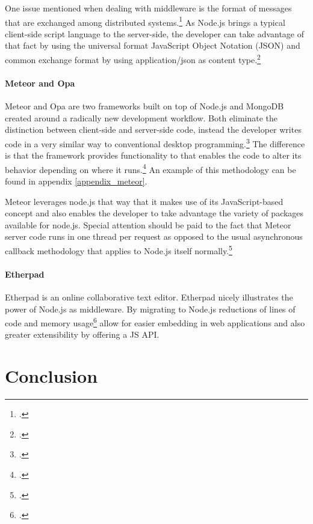 One issue mentioned when dealing with middleware is the format of messages that are exchanged among distributed systems.\footcite[149]{Tannenbaum_2007} As Node.js brings a typical client-side script language to the server-side, the developer can take advantage of that fact by using the universal format JavaScript Object Notation (JSON) and common exchange format by using application/json as content type.\footcite[Cf.][]{rfc4627}

\paragraph{Meteor and Opa}
Meteor and Opa are two frameworks built on top of Node.js and MongoDB created around a radically new development workflow. Both eliminate the distinction between client-side and server-side code, instead the developer writes code in a very similar way to conventional desktop programming.\footcite[Cf.][]{meteor_docs} The difference is that the framework provides functionality to that enables the code to alter its behavior depending on where it runs.\footcite[Cf.][]{meteor_docs} An example of this methodology can be found in appendix \ref{appendix_meteor}.

Meteor leverages node.js that way that it makes use of its JavaScript-based concept and also enables the developer to take advantage the variety of packages available for node.js. Special attention should be paid to the fact that Meteor server code runs in one thread per request as opposed to the usual asynchronous callback methodology that applies to Node.js itself normally.\footcite[Cf.][]{meteor_docs}

\paragraph{Etherpad}
Etherpad is an online collaborative text editor. Etherpad nicely illustrates the power of Node.js as middleware. By migrating to Node.js reductions of lines of code and memory usage\footcite[Cf.][]{Weissschuh_2013} allow for easier embedding in web applications and also greater extensibility by offering a JS API.


\section{Conclusion}
\label{conclusion}


